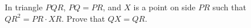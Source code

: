 In triangle $PQR$, $PQ=PR$, and $X$ is a point on side $PR$ such that $QR^2=PR\cdot XR$. Prove that $QX=QR$.
